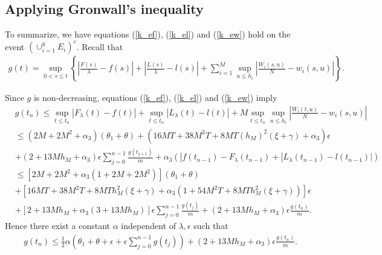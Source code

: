 \documentclass[12pt]{article}
\numberwithin{equation}{section}  %
\begin{document}
\subsection{Applying Gronwall's inequality}\label{kchoice_finalstep}
To summarize, we have equations (\ref{k_ef}), (\ref{k_el}) and (\ref{k_ew}) hold on the event $(\cup_{i=1}^8 E_i)^c$. Recall that 
\begin{align*} 
g(t)=\sup_{0<s\leq t}\left\{\left|\frac{F(s)}{\lambda}-f(s)\right|+\left|\frac{L(s)}{\lambda}-l(s)\right|+\sum_{i=1}^M \sup_{u\leq h_i} \left|\frac{W_i(s,u)}{N}-w_i(s,u) \right| \right\}.
\end{align*}

Since $g$ is non-decreasing, equations (\ref{k_ef}), (\ref{k_el}) and (\ref{k_ew}) imply
\begin{align*} 
&g(t_n)\leq \sup_{t\leq t_n} |F_\lambda(t)-f(t)|+\sup_{t\leq t_n} |L_\lambda(t)-l(t)|+M\sup_{t\leq t_n}\sup_{u\leq h_i}  |\frac{W_i(t,u)}{N}-w_i(s,u)|\\
&\leq (2M+2M^2+\alpha_3)(\theta_1+\theta)+(16MT+38M^2 T+8 M T (h_M)^2(\xi+\gamma)+\alpha_3)\epsilon\\
&+(2+13 M h_M+\alpha_3)\epsilon \sum_{j=0}^{n-1} \frac{ g(t_{j+1})}{m}+\alpha_3\left(|f(t_{n-1})-F_\lambda(t_{n-1})+|L_{\lambda}(t_{n-1})-l(t_{n-1})|
\right)\\
&\leq [2M+2M^2+\alpha_3(1+2M+2M^2)](\theta_1+\theta)\\
&+[16MT+38M^2 T+8 M T h_M^2(\xi+\gamma)+\alpha_3(1+54M^2 T+8 M T h_M^2(\xi+\gamma))]\epsilon\\
&+[2+13 M h_M+\alpha_3(3+13 M h_M)]\epsilon \sum_{j=0}^{n-1} \frac{ g(t_{j})}{m}+(2+13 M h_M+\alpha_3)\epsilon  \frac{ g(t_n)}{m}.
\end{align*} 
Hence there exist a constant $\alpha$ independent of $\lambda,\epsilon$ such that
\begin{align*} 
&g(t_n)\leq \frac{1}{2}\alpha\left(
\theta_1+\theta+\epsilon+\epsilon \sum_{j=0}^{n-1}  g(t_{j})
\right)
+(2+13 M h_M+\alpha_3)\epsilon  \frac{ g(t_n)}{m}.
\end{align*} 
\end{document}
